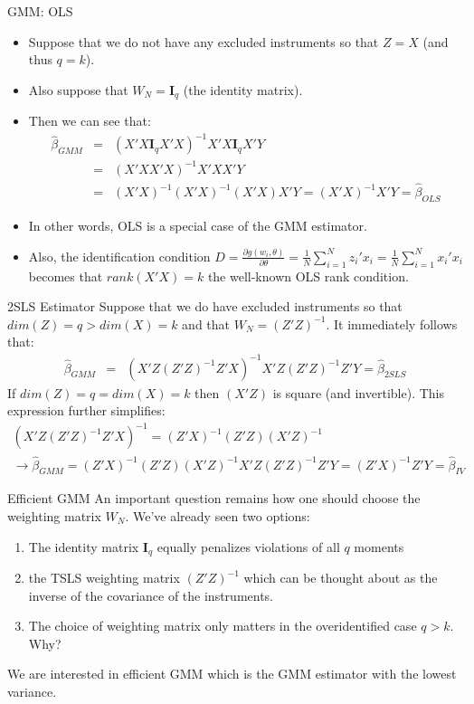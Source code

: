 \begin{frame}{GMM: OLS}
\begin{itemize}
\item Suppose that we do not have any excluded instruments so that $Z=X$ (and thus $q=k$). 
\item Also suppose that $W_N = \mathbf{I}_q$ (the identity matrix). 
\item Then we can see that:
\begin{eqnarray*}
\hat{\beta}_{GMM} &=& (X'X \mathbf{I}_q X' X)^{-1} X' X \mathbf{I}_q X'Y\\
 &=& (X'X X' X)^{-1} X' X X'Y\\
 &=& (X'X)^{-1} (X' X)^{-1} (X' X) X'Y =  (X'X)^{-1} X'Y = \hat{\beta}_{OLS}
\end{eqnarray*}

\item In other words, OLS is a special case of the GMM estimator.
\item  Also, the identification condition $D=\frac{\partial g(w_i,\theta)}{\partial \theta} =\frac{1}{N} \sum_{i=1}^N z_i' x_i = \frac{1}{N} \sum_{i=1}^N x_i' x_i$ becomes that $rank(X'X) = k$ the well-known OLS rank condition.\\
\end{itemize}
\end{frame}

\begin{frame}{2SLS Estimator}
Suppose that we do have excluded instruments so that $dim(Z) = q > dim(X) = k$ and that $W_N = (Z'Z)^{-1}$. It immediately follows that:
\begin{eqnarray*}
\hat{\beta}_{GMM} &=& (X'Z (Z'Z)^{-1} Z' X)^{-1} X' Z (Z'Z)^{-1} Z'Y = \hat{\beta}_{2SLS}
\end{eqnarray*}
If $dim(Z) = q = dim(X) = k$ then $(X'Z)$ is square (and invertible). This expression further simplifies:
\begin{eqnarray*}
(X'Z (Z'Z)^{-1} Z' X)^{-1} = (Z'X)^{-1} (Z'Z) (X'Z)^{-1}\\
\rightarrow \hat{\beta}_{GMM} = (Z'X)^{-1} (Z'Z) (X'Z)^{-1}  X' Z (Z'Z)^{-1} Z'Y = (Z'X)^{-1} Z'Y = \hat{\beta}_{IV}
\end{eqnarray*}
\end{frame}

\begin{frame}{Efficient GMM}
An important question remains how one should choose the weighting matrix $W_N$. We've already seen two options: 
\begin{enumerate}
\item The identity matrix $\mathbf{I}_q$ equally penalizes violations of all $q$ moments
\item  the TSLS weighting matrix $(Z'Z)^{-1}$ which can be thought about as the inverse of the covariance of the instruments. 
\item The choice of weighting matrix only matters in the \alert{overidentified} case $q > k$. Why?
\end{enumerate}
We are interested in \alert{efficient GMM} which is the GMM estimator with the lowest variance.

\end{frame}

